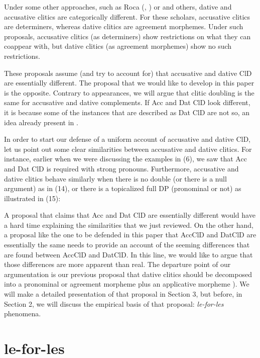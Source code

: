\documentclass[output=paper,colorlinks,citecolor=brown,
]{langscibook}
\begin{document}


Under some other approaches, such as Roca (\citeyear{roca1992}, \citeyear{roca1996}) or \citet{ormazabal2013} and others, dative and accusative clitics are categorically different. For these scholars, accusative clitics are determiners, whereas dative clitics are agreement morphemes. Under such proposals, accusative clitics (as determiners) show restrictions on what they can coappear with, but dative clitics (as agreement morphemes) show no such restrictions. 

These proposals assume (and try to account for) that accusative and dative ClD are essentially different. The proposal that we would like to develop in this paper is the opposite. Contrary to appearances, we will argue that clitic doubling is the same for accusative and dative complements. If Acc and Dat ClD look different, it is because some of the instances that are described as Dat ClD are not so, an idea already present in \citet[113--115]{roca1996}. 

In order to start our defense of a uniform account of accusative and dative ClD, let us point out some clear similarities between accusative and dative clitics. For instance, earlier when we were discussing the examples in (6), we saw that Acc and Dat ClD is required with strong pronouns. Furthermore, accusative and dative clitics behave similarly when there is no double (or there is a null argument) as in (14), or there is a topicalized full DP (pronominal or not) as illustrated in (15):




A proposal that claims that Acc and Dat ClD are essentially different would have a hard time explaining the similarities that we just reviewed. On the other hand, a proposal like the one to be defended in this paper that AccClD and DatClD are essentially the same needs to provide an account of the seeming differences that are found between AccClD and DatClD. In this line, we would like to argue that those differences are more apparent than real. The departure point of our argumentation is our previous proposal that dative clitics should be decomposed into a pronominal or agreement morpheme plus an applicative morpheme \citep{ausin2017}). We will make a detailed presentation of that proposal in Section 3, but before, in Section 2, we will discuss the empirical basis of that proposal: \textit{le-for-les} phenomena.


\section{le-for-les}
\end{document}
